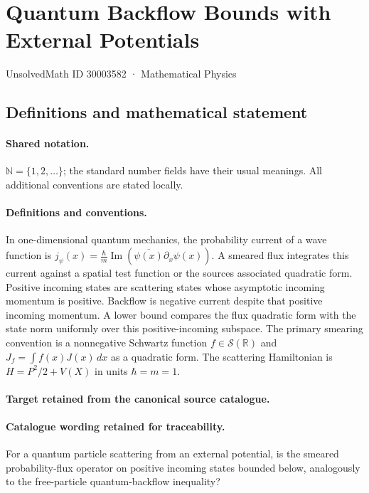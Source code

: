 \documentclass[11pt]{article}
\begin{document}
\setcounter{section}{30003581}
\section{Quantum Backflow Bounds with External Potentials}\label{30003582}
{\small UnsolvedMath ID 30003582 · Mathematical Physics}
\subsection{Definitions and mathematical statement}

\paragraph{Shared notation.}$\mathbb N=\{1,2,\ldots\}$; the standard number fields have their usual meanings. All additional conventions are stated locally.


\paragraph{Definitions and conventions.}
In one-dimensional quantum mechanics, the probability current of a wave function is $j_\psi(x)=\frac{\hbar}{m}\operatorname{Im}(\overline{\psi(x)}\partial_x\psi(x))$. A smeared flux integrates this current against a spatial test function or the source\textquotesingle s associated quadratic form. Positive incoming states are scattering states whose asymptotic incoming momentum is positive. Backflow is negative current despite that positive incoming momentum. A lower bound compares the flux quadratic form with the state norm uniformly over this positive-incoming subspace. The primary smearing convention is a nonnegative Schwartz function $f\in\mathcal S(\mathbb R)$ and $J_f=\int f(x)J(x)\,dx$ as a quadratic form. The scattering Hamiltonian is $H=P^2/2+V(X)$ in units $\hbar=m=1$.

\paragraph{Target retained from the canonical source catalogue.}
\paragraph{Catalogue wording retained for traceability.}
For a quantum particle scattering from an external potential, is the smeared probability-flux operator on positive incoming states bounded below, analogously to the free-particle quantum-backflow inequality?
\end{document}
